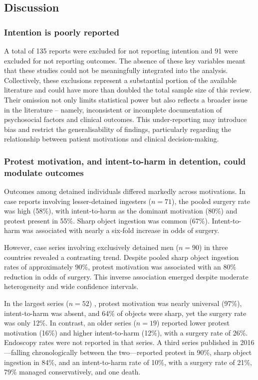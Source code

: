 \subsection{Discussion}

\subsubsection{Intention is poorly reported}
A total of 135 reports were excluded for not reporting intention and 91 were excluded for not reporting outcomes. The absence of these key variables meant that these studies could not be meaningfully integrated into the analysis. Collectively, these exclusions represent a substantial portion of the available literature and could have more than doubled the total sample size of this review. Their omission not only limits statistical power but also reflects a broader issue in the literature -- namely, inconsistent or incomplete documentation of psychosocial factors and clinical outcomes. This under-reporting may introduce bias and restrict the generalisability of findings, particularly regarding the relationship between patient motivations and clinical decision-making.

\subsubsection{Protest motivation, and intent-to-harm in detention, could modulate outcomes}
Outcomes among detained individuals differed markedly across motivations. In case reports involving lesser-detained ingesters ($n = 71$), the pooled surgery rate was high (58\%), with intent-to-harm as the dominant motivation (80\%) and protest present in 55\%. Sharp object ingestion was common (67\%). Intent-to-harm was associated with nearly a six-fold increase in odds of surgery.

However, case series involving exclusively detained men ($n = 90$) in three countries revealed a contrasting trend. Despite pooled sharp object ingestion rates of approximately 90\%, protest motivation was associated with an 80\% reduction in odds of surgery. This inverse association emerged despite moderate heterogeneity and wide confidence intervals.

In the largest series ($n = 52$) \cite{Lee_2007}, protest motivation was nearly universal (97\%), intent-to-harm was absent, and 64\% of objects were sharp, yet the surgery rate was only 12\%. In contrast, an older series ($n = 19$) \cite{Karp_1991b} reported lower protest motivation (16\%) and higher intent-to-harm (12\%), with a surgery rate of 26\%. Endoscopy rates were not reported in that series. A third series published in 2016 \cite{Elghali_2016}—falling chronologically between the two—reported protest in 90\%, sharp object ingestion in 84\%, and an intent-to-harm rate of 10\%, with a surgery rate of 21\%, 79\% managed conservatively, and one death.

